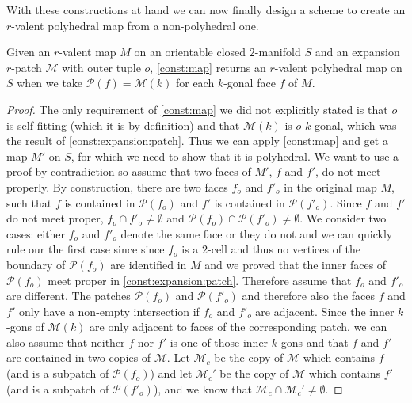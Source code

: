 With these constructions at hand we can now finally design a scheme to create an $r$-valent polyhedral map from a non-polyhedral one.

\begin{proposition}\label{thm:const:polymap}
  Given an $r$-valent map $M$ on an orientable closed $2$-manifold $S$ and an expansion $r$-patch $\mathcal{M}$ with outer tuple $o$, \autoref{const:map} returns an $r$-valent polyhedral map on $S$ when we take $\mathcal{P}(f) = \mathcal{M}(k)$ for each $k$-gonal face $f$ of $M$.
\begin{proof}
The only requirement of \autoref{const:map} we did not explicitly stated is that $o$ is self-fitting (which it is by definition) and that $\mathcal{M}(k)$ is $o$-$k$-gonal, which was the result of \autoref{const:expansion:patch}. Thus we can apply \autoref{const:map} and get a map $M'$ on $S$, for which we need to show that it is polyhedral. We want to use a proof by contradiction so assume that two faces of $M'$, $f$ and $f'$, do not meet properly. By construction, there are two faces $f_o$ and $f'_o$ in the original map $M$, such that $f$ is contained in $\mathcal{P}(f_o)$ and $f'$ is contained in $\mathcal{P}(f'_o)$. Since $f$ and $f'$ do not meet proper, $f_o \cap f'_o \neq \emptyset$ and $\mathcal{P}(f_o) \cap \mathcal{P}(f'_o) \neq \emptyset$. We consider two cases: either $f_o$ and $f'_o$ denote the same face or they do not and we can quickly rule our the first case since since $f_o$ is a $2$-cell and thus no vertices of the boundary of $\mathcal{P}(f_o)$ are identified in $M$ and we proved that the inner faces of $\mathcal{P}(f_o)$ meet proper in \autoref{const:expansion:patch}. Therefore assume that $f_o$ and $f'_o$ are different. The patches $\mathcal{P}(f_o)$ and $\mathcal{P}(f'_o)$ and therefore also the faces $f$ and $f'$ only have a non-empty intersection if $f_o$ and $f'_o$ are adjacent. Since the inner $k$-gons of $\mathcal{M}(k)$ are only adjacent to faces of the corresponding patch, we can also assume that neither $f$ nor $f'$ is one of those inner $k$-gons and that $f$ and $f'$ are contained in two copies of $\mathcal{M}$. Let $\mathcal{M}_c$ be the copy of $\mathcal{M}$ which contains $f$ (and is a subpatch of $\mathcal{P}(f_o)$) and let $\mathcal{M}_c'$ be the copy of $\mathcal{M}$ which contains $f'$ (and is a subpatch of $\mathcal{P}(f'_o)$), and we know that $\mathcal{M}_c \cap \mathcal{M}_c' \neq \emptyset$. 


\end{proof}
\end{proposition}
